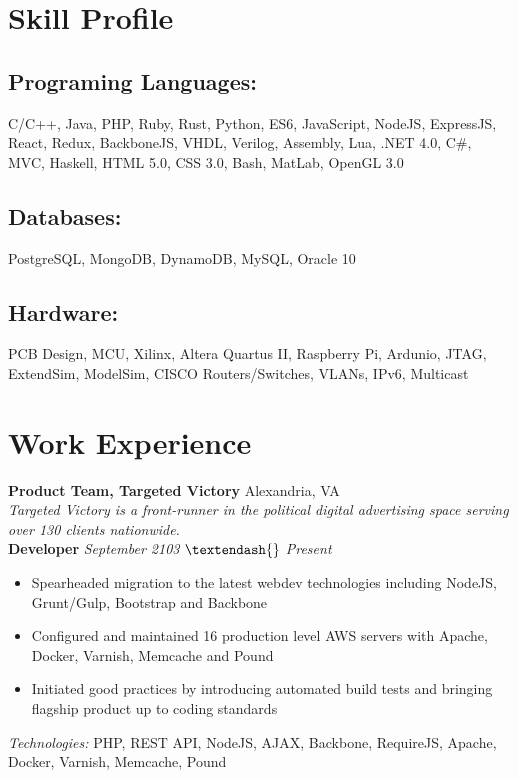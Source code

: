 \documentclass[10pt]{article}
\newcommand{\forceindent}{\leavevmode{\parindent=1em\indent}}
\begin{document}
\section*{Skill Profile}
\subsection*{Programing Languages:}
C/C++, Java, PHP, Ruby, Rust, Python, ES6, JavaScript, NodeJS, ExpressJS, React, Redux, BackboneJS, VHDL, Verilog, Assembly, Lua, .NET 4.0, C\#, MVC, Haskell, HTML 5.0, CSS 3.0, Bash, MatLab, OpenGL 3.0
\subsection*{Databases:}
PostgreSQL, MongoDB, DynamoDB, MySQL, Oracle 10
\subsection*{Hardware:}
PCB Design, MCU, Xilinx, Altera Quartus II, Raspberry Pi, Ardunio, JTAG, ExtendSim, ModelSim, CISCO Routers/Switches, VLANs, IPv6, Multicast

\section*{Work Experience}
\textbf{Product Team, Targeted Victory} \hfill Alexandria, VA \\
\textit{Targeted Victory is a front-runner in the political digital advertising space serving over 130 clients nationwide.} \\
\forceindent \textbf{Developer} \hfill \textit{September 2103 $\textendash{}$ Present}
\begin{itemize}
  \item Spearheaded migration to the latest webdev technologies including NodeJS, Grunt/Gulp, Bootstrap and Backbone
  \item Configured and maintained 16 production level AWS servers with Apache, Docker, Varnish, Memcache and Pound
  \item Initiated good practices by introducing automated build tests and bringing flagship product up to coding standards
\end{itemize}
\forceindent \textit{Technologies:} PHP, REST API, NodeJS, AJAX, Backbone, RequireJS, Apache, Docker, Varnish, Memcache, Pound
\end{document}
